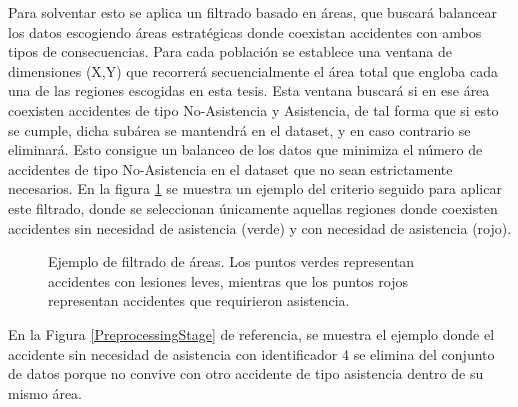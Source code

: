 \documentclass{uathesis-es}
\begin{document}
Para solventar esto se aplica un filtrado basado en áreas, que buscará balancear los datos escogiendo áreas estratégicas donde coexistan accidentes con ambos tipos de consecuencias. Para cada población se establece una ventana de dimensiones (X,Y) que recorrerá secuencialmente el área total que engloba cada una de las regiones escogidas en esta tesis. Esta ventana buscará si en ese área coexisten accidentes de tipo No-Asistencia y Asistencia, de tal forma que si esto se cumple, dicha subárea se mantendrá en el dataset, y en caso contrario se eliminará. Esto consigue un balanceo de los datos que minimiza el número de accidentes de tipo No-Asistencia en el dataset que no sean estrictamente necesarios. En la figura \ref{Areas} se muestra un ejemplo del criterio seguido para aplicar este filtrado, donde se seleccionan únicamente aquellas regiones donde coexisten accidentes sin necesidad de asistencia (verde) y con necesidad de asistencia (rojo).

\begin{figure}[H]
    \centering    

    \label{Areas}
    \caption{Ejemplo de filtrado de áreas. Los puntos verdes representan accidentes con lesiones leves, mientras que los puntos rojos representan accidentes que requirieron asistencia.}
\end{figure}

En la Figura \ref{PreprocessingStage} de referencia, se muestra el ejemplo donde el accidente sin necesidad de asistencia con identificador 4 se elimina del conjunto de datos porque no convive con otro accidente de tipo asistencia dentro de su mismo área.
\end{document}
